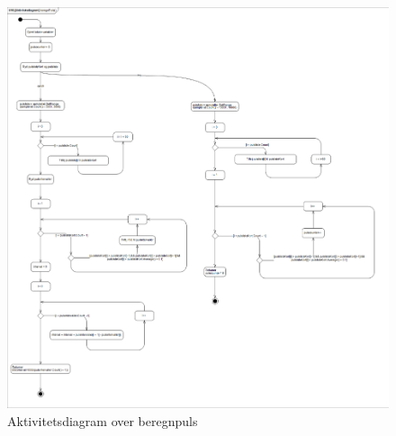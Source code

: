 \begin{figure}[H]
	\centering
	\includegraphics[width=1\textwidth]{Figurer/aktivitetsdiagram_beregnPuls}
	\caption{Aktivitetsdiagram over beregnpuls}
\end{figure}
